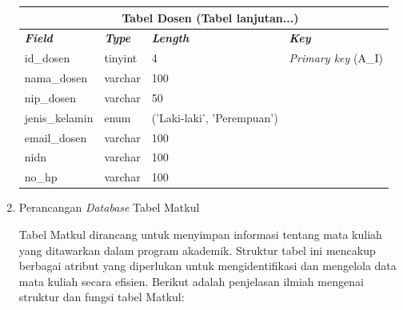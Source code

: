 \begin{enumerate}
{\begin{longtable}{l l l l}
				      \multicolumn{4}{c}{\tablename\ \thetable\ {Tabel Dosen} \space (Tabel lanjutan...)}                         \\
				      \hline
				      \textbf{\textit{Field}} & \textbf{\textit{Type}} & \textbf{\textit{Length}}   & \textbf{\textit{Key}}       \\
				      \hline
				      \endhead

				      id\_dosen               & tinyint                & 4                          & \textit{Primary key} (A\_I) \\
				      nama\_dosen             & varchar                & 100                        &                             \\
				      nip\_dosen              & varchar                & 50                         &                             \\
				      jenis\_kelamin          & enum                   & ('Laki-laki', 'Perempuan') &                             \\
				      email\_dosen            & varchar                & 100                        &                             \\
				      nidn                    & varchar                & 100                        &                             \\
				      no\_hp                  & varchar                & 100                        &                             \\
				      \hline
			      \end{longtable}
		      }

	\item Perancangan \textit{Database} Tabel Matkul 

	      Tabel Matkul dirancang untuk menyimpan informasi tentang mata kuliah yang ditawarkan dalam program akademik. Struktur tabel ini mencakup berbagai atribut yang diperlukan untuk mengidentifikasi dan mengelola data mata kuliah secara efisien. Berikut adalah penjelasan ilmiah mengenai struktur dan fungsi tabel Matkul:


\end{enumerate}
